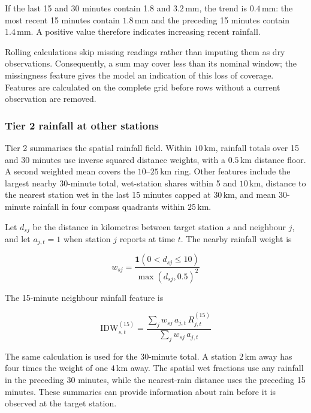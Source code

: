 \documentclass[11pt,a4paper]{article}
\begin{document}
If the last 15 and 30 minutes contain 1.8 and \(3.2\,\mathrm{mm}\), the trend is \(0.4\,\mathrm{mm}\): the most recent 15 minutes contain \(1.8\,\mathrm{mm}\) and the preceding 15 minutes contain \(1.4\,\mathrm{mm}\). A positive value therefore indicates increasing recent rainfall.


Rolling calculations skip missing readings rather than imputing them as dry observations. Consequently, a sum may cover less than its nominal window; the missingness feature gives the model an indication of this loss of coverage. Features are calculated on the complete grid before rows without a current observation are removed.


\subsubsection*{Tier 2 rainfall at other stations}
{}


Tier 2 summarises the spatial rainfall field. Within \(10\,\mathrm{km}\), rainfall totals over 15 and 30 minutes use inverse squared distance weights, with a \(0.5\,\mathrm{km}\) distance floor. A second weighted mean covers the \(10\text{--}25\,\mathrm{km}\) ring. Other features include the largest nearby 30-minute total, wet-station shares within 5 and \(10\,\mathrm{km}\), distance to the nearest station wet in the last 15 minutes capped at \(30\,\mathrm{km}\), and mean 30-minute rainfall in four compass quadrants within \(25\,\mathrm{km}\).


Let \(d_{sj}\) be the distance in kilometres between target station \(s\) and neighbour \(j\), and let \(a_{j,t}=1\) when station \(j\) reports at time \(t\). The nearby rainfall weight is


\[
w_{sj}=\frac{\mathbf{1}(0<d_{sj}\leq10)}{\max(d_{sj},0.5)^2}
\]


The 15-minute neighbour rainfall feature is


\[
\mathrm{IDW}_{s,t}^{(15)}=\frac{\sum_j w_{sj}\,a_{j,t}\,R_{j,t}^{(15)}}{\sum_j w_{sj}\,a_{j,t}}
\]


The same calculation is used for the 30-minute total. A station \(2\,\mathrm{km}\) away has four times the weight of one \(4\,\mathrm{km}\) away. The spatial wet fractions use any rainfall in the preceding 30 minutes, while the nearest-rain distance uses the preceding 15 minutes. These summaries can provide information about rain before it is observed at the target station. 
\end{document}
